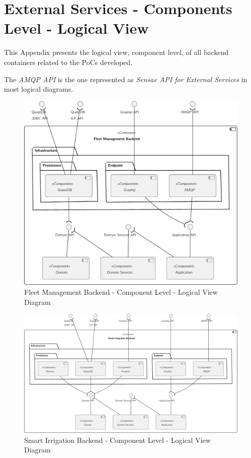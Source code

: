 \chapter{External Services - Components Level - Logical View}
\label{AppendixC2}

This Appendix presents the logical view, component level, of all backend containers related to the \gls{PoC}s developed.

The \textit{AMQP API} is the one represented as \textit{Sensae API for External Services} in most logical diagrams.

\begin{figure}[H]
   \centering
   \includegraphics[page=1,width=0.8\columnwidth]{assets/diagrams/design/architectural/level3/logical/fleet-management-backend.pdf}
   \caption[Fleet Management Backend - Component Level - Logical View Diagram]{Fleet Management Backend - Component Level - Logical View Diagram}
   \label{fig:AppendixC2:fleet}
\end{figure}

\begin{figure}[H]
   \centering
   \includegraphics[page=1,width=\columnwidth]{assets/diagrams/design/architectural/level3/logical/smart-irrigation-backend.pdf}
   \caption[Smart Irrigation Backend - Component Level - Logical View Diagram]{Smart Irrigation Backend - Component Level - Logical View Diagram}
   \label{fig:AppendixC2:irrig}
\end{figure}

